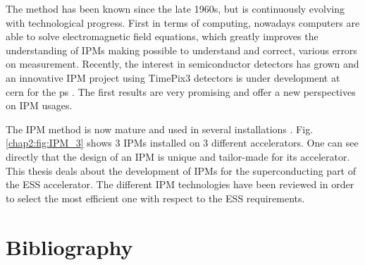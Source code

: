 \begin{refsection}

  The method has been known since the late 1960s, but is continuously evolving with technological progress. First in terms of computing, nowadays computers are able to solve electromagnetic field equations, which greatly improves the understanding of IPMs making possible to understand and correct, various errors on measurement.
  Recently, the interest in semiconductor detectors has grown and an innovative IPM project using TimePix3 detectors is under development at \acrshort{cern} for the \acrshort{ps} \cite{Storey2015}. The first results are very promising \cite{Storey2017} and offer a new perspectives on IPM usages.

  The IPM method is now mature and used in several installations \cite{Krider1989,Wittenburg1992,Satou2006,Giacomini2011,Morris2011,egberts2012}.
  Fig. \ref{chap2:fig:IPM_3} shows 3 IPMs installed on 3 different accelerators. One can see directly that the design of an IPM is unique and tailor-made for its accelerator. This thesis deals about the development of IPMs for the superconducting part of the ESS accelerator. The different IPM technologies have been reviewed in order to select the most efficient one with respect to the ESS requirements.

  

  \cleardoublepage
  \section*{Bibliography}
  \label{ch2:bib}
  \printbibliography[heading=subbibliography]

\end{refsection}